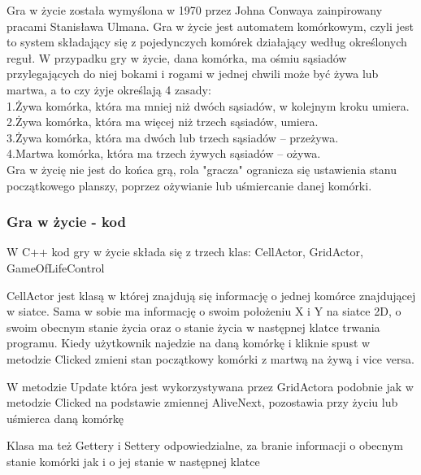 \documentclass[a4paper,12pt,reqno]{article}
\begin{document}
Gra w życie została wymyślona w 1970 przez Johna Conwaya zainpirowany pracami Stanisława Ulmana. Gra w życie jest automatem komórkowym, czyli jest to system składający się z pojedynczych komórek działający według określonych reguł.\cite{game_of_life} W przypadku gry w życie, dana komórka, ma ośmiu sąsiadów przylegających do niej bokami i rogami w jednej chwili może być żywa lub martwa, a to czy żyje określają 4 zasady:\\
1.Żywa komórka, która ma mniej niż dwóch sąsiadów, w kolejnym kroku umiera. \\
2.Żywa komórka, która ma więcej niż trzech sąsiadów, umiera.\\
3.Żywa komórka, która ma dwóch lub trzech sąsiadów – przeżywa.\\
4.Martwa komórka, która ma trzech żywych sąsiadów – ożywa.\\

Gra w życię nie jest do końca grą, rola "gracza" ogranicza się ustawienia stanu początkowego planszy, poprzez ożywianie lub uśmiercanie danej komórki.\cite{game_of_life_wiki}


\subsubsection{Gra w życie - kod}

W C++ kod gry w życie składa się z trzech klas: CellActor, GridActor, GameOfLifeControl

CellActor jest klasą w której znajdują się informację o jednej komórce znajdującej w siatce. Sama w sobie ma informację o swoim położeniu X i Y na siatce 2D, o swoim obecnym stanie życia oraz o stanie życia w następnej klatce trwania programu. 
Kiedy użytkownik najedzie na daną komórkę i kliknie spust w metodzie Clicked zmieni stan początkowy komórki z martwą na żywą i vice versa.



W metodzie Update która jest wykorzystywana przez GridActora podobnie jak w metodzie Clicked na podstawie zmiennej AliveNext, pozostawia przy życiu lub uśmierca daną komórkę



Klasa ma też Gettery i Settery odpowiedzialne, za branie informacji o obecnym stanie komórki jak i o jej stanie w następnej klatce
\end{document}
